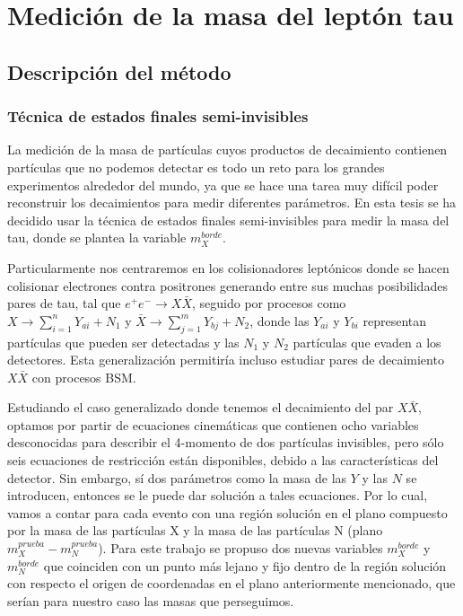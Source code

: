 \chapter{Medición de la masa del leptón tau}

\section{Descripción del método}
\subsection{Técnica de estados finales semi-invisibles}
La medición de la masa de partículas cuyos productos de decaimiento contienen partículas que no podemos detectar es todo un reto para los grandes experimentos alrededor del mundo, ya que se hace una tarea muy difícil poder reconstruir los decaimientos para medir diferentes parámetros. En esta tesis se ha decidido usar la técnica de estados finales semi-invisibles para medir la masa del tau, donde se plantea la variable \(m^{borde}_{X}\)\cite{PhysRevD.95.075037}.

Particularmente nos centraremos en los colisionadores leptónicos donde se hacen colisionar electrones contra positrones generando entre sus muchas posibilidades pares de tau, tal que \(e^+e^-\rightarrow X\bar{X}\), seguido por procesos como \(X\rightarrow \sum_{i=1}^{n}  Y_{ai}+N_{1}\) y \(\bar{X}\rightarrow \sum_{j=1}^{m}Y_{bj}+N_{2}\), donde  las \(Y_{ai}\) y \(Y_{bi}\) representan partículas que pueden ser detectadas y las \(N_1\) y \(N_2\) partículas que evaden a los detectores. Esta generalización permitiría incluso estudiar pares de decaimiento \(X\bar{X}\) con procesos BSM. 

Estudiando el caso generalizado donde tenemos el decaimiento del par \(X\bar{X}\), optamos por partir de ecuaciones cinemáticas que contienen ocho variables desconocidas para describir el 4-momento de dos partículas invisibles, pero sólo seis ecuaciones de restricción están disponibles, debido a las características del detector. Sin embargo, sí dos parámetros como la masa de las \(Y\) y las \(N\) se introducen, entonces se le puede dar solución a tales ecuaciones. Por lo cual, vamos a contar para cada evento con una región solución en el plano compuesto por la masa de las partículas X y la masa de las partículas N (plano \(m_{X}^{prueba}-m_{N}^{prueba}\)). Para este trabajo se propuso dos nuevas variables \(m_{X}^{borde}\) y \(m_{N}^{borde}\) que coinciden con un punto más lejano y fijo dentro de la región solución con respecto el origen de coordenadas en el plano anteriormente mencionado, que serían para nuestro caso las masas que perseguimos. 

